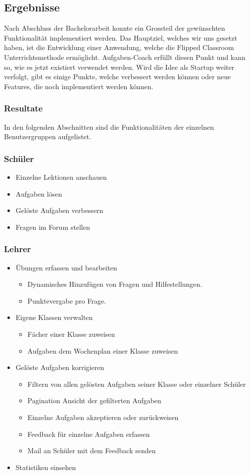 \newpage
\subsection{Ergebnisse}
Nach Abschluss der Bachelorarbeit konnte ein Grossteil der gewünschten Funktionalität implementiert werden. Das Hauptziel, welches wir uns gesetzt haben, ist die Entwicklung einer Anwendung, welche die Flipped Classroom Unterrichtsmethode ermöglicht. Aufgaben-Coach erfüllt diesen Punkt und kann so, wie es jetzt existiert verwendet werden. Wird die Idee als Startup weiter verfolgt, gibt es einige Punkte, welche verbessert werden können oder neue Features, die noch implementiert werden können.
\subsubsection{Resultate}
In den folgenden Abschnitten sind die Funktionalitäten der einzelnen Benutzergruppen aufgelistet.
\subsubsection*{Schüler}
\begin{itemize}
	\item Einzelne Lektionen anschauen
	\item Aufgaben lösen
	\item Gelöste Aufgaben verbessern
	\item Fragen im Forum stellen
\end{itemize}

\subsubsection*{Lehrer}
\begin{itemize}
	\item Übungen erfassen und bearbeiten
	\begin{itemize}
		\item Dynamisches Hinzufügen von Fragen und Hilfestellungen.
		\item Punktevergabe pro Frage.
	\end{itemize}
	\item Eigene Klassen verwalten
	\begin{itemize}
		\item Fächer einer Klasse zuweisen
		\item Aufgaben dem Wochenplan einer Klasse zuweisen
	\end{itemize}
	\item Gelöste Aufgaben korrigieren
	\begin{itemize}
		\item Filtern von allen gelösten Aufgaben seiner Klasse oder einzelner Schüler
		\item Pagination Ansicht der gefilterten Aufgaben
		\item Einzelne Aufgaben akzeptieren oder zurückweisen
		\item Feedback für einzelne Aufgaben erfassen
		\item Mail an Schüler mit dem Feedback senden
	\end{itemize}
	\item Statistiken einsehen
\end{itemize}


